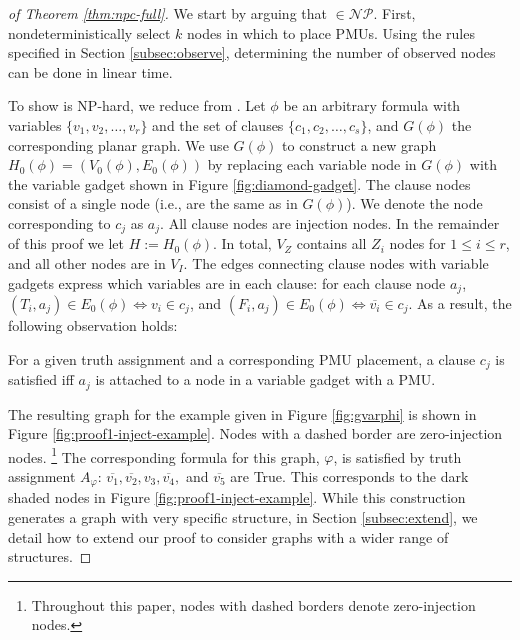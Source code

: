\begin{proof}[of Theorem \ref{thm:npc-full}]
We start by arguing that \full $\in \mathcal{NP}$. First, nondeterministically select $k$ nodes in which to place PMUs. Using the rules specified in Section \ref{subsec:observe}, determining
the number of observed nodes can be done in linear time.

To show \full is NP-hard, we reduce from \sats.  Let $\phi$ be an arbitrary \sat formula with variables 
$\{v_1,v_2, \dots , v_r\}$ and the set of clauses $\{c_1,c_2,\dots , c_s \}$, and $G(\phi)$ the corresponding planar graph. We use $G(\phi)$ to construct a new graph $H_0(\phi) = (V_0(\phi), E_0(\phi))$ by replacing each variable
node in $G(\phi)$ with the variable gadget shown in Figure \ref{fig:diamond-gadget}. The clause nodes consist of a single node (i.e., are the same
as in $G(\phi)$). We denote the node corresponding to $c_j$ as $a_j$. All clause nodes are injection nodes.  In the remainder of this proof we let $H := H_0(\phi)$.
In total, $V_Z$ contains all $Z_i$ nodes for $1 \leq i \leq r$, and all other nodes are in $V_I$.  The edges connecting clause nodes with variable gadgets express which variables are in each clause: for each clause node $a_j$, $(T_i, a_j)\in E_0(\phi) \Leftrightarrow v_i\in c_j$, and $(F_i, a_j)\in E_0(\phi) \Leftrightarrow \overline{v_i}\in c_j$. As a result, the following observation holds:

\begin{observation}\label{obs:1}
For a given truth assignment and a corresponding PMU placement, a clause $c_j$ is satisfied iff $a_j$ is attached to a node in a variable gadget with a PMU. 
\end{observation}


The resulting graph for the example given in Figure \ref{fig:gvarphi} is shown in Figure \ref{fig:proof1-inject-example}.  Nodes with a dashed border are zero-injection nodes. 
{\footnote {\small  Throughout this paper, nodes with dashed borders denote zero-injection nodes. }} 
The corresponding formula for this graph, $\varphi$,
is satisfied by truth assignment $A_{\varphi}$: $\overline{v_1}, \overline{v_2}, v_3, \overline{v_4},$ and $\overline{v_5}$ are True. This corresponds to the dark shaded nodes in Figure
\ref{fig:proof1-inject-example}. While this construction generates a graph with very specific structure, in Section \ref{subsec:extend}, we detail how to extend our proof to consider graphs with a wider range of structures.%



\end{proof}
